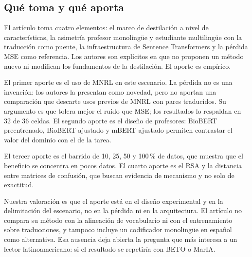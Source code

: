 \subsection{Qué toma y qué aporta}

El artículo toma cuatro elementos: el marco de destilación a nivel de características, la asimetría profesor monolingüe y estudiante multilingüe con la traducción como puente, la infraestructura de Sentence Transformers y la pérdida MSE como referencia. Los autores son explícitos en que no proponen un método nuevo ni modifican los fundamentos de la destilación. El aporte es empírico.

El primer aporte es el uso de MNRL en este escenario. La pérdida no es una invención: los autores la presentan como novedad, pero no aportan una comparación que descarte usos previos de MNRL con pares traducidos. Su argumento es que tolera mejor el ruido que MSE; los resultados lo respaldan en 32 de 36 celdas. El segundo aporte es el diseño de profesores: BioBERT preentrenado, BioBERT ajustado y mBERT ajustado permiten contrastar el valor del dominio con el de la tarea.

El tercer aporte es el barrido de 10, 25, 50 y 100\,\% de datos, que muestra que el beneficio se concentra en pocos datos. El cuarto aporte es el RSA y la distancia entre matrices de confusión, que buscan evidencia de mecanismo y no solo de exactitud.

Nuestra valoración es que el aporte está en el diseño experimental y en la delimitación del escenario, no en la pérdida ni en la arquitectura. El artículo no compara su método con la alineación de vocabulario ni con el entrenamiento sobre traducciones, y tampoco incluye un codificador monolingüe en español como alternativa. Esa ausencia deja abierta la pregunta que más interesa a un lector latinoamericano: si el resultado se repetiría con BETO o MarIA.
